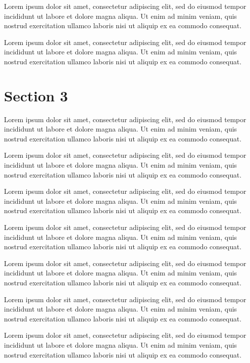 \documentclass{book}
\begin{document}
Lorem ipsum dolor sit amet, consectetur adipiscing elit, sed do eiusmod tempor incididunt ut labore et dolore magna aliqua. Ut enim ad minim veniam, quis nostrud exercitation ullamco laboris nisi ut aliquip ex ea commodo consequat.

Lorem ipsum dolor sit amet, consectetur adipiscing elit, sed do eiusmod tempor incididunt ut labore et dolore magna aliqua. Ut enim ad minim veniam, quis nostrud exercitation ullamco laboris nisi ut aliquip ex ea commodo consequat.

\section{Section 3}
Lorem ipsum dolor sit amet, consectetur adipiscing elit, sed do eiusmod tempor incididunt ut labore et dolore magna aliqua. Ut enim ad minim veniam, quis nostrud exercitation ullamco laboris nisi ut aliquip ex ea commodo consequat.

Lorem ipsum dolor sit amet, consectetur adipiscing elit, sed do eiusmod tempor incididunt ut labore et dolore magna aliqua. Ut enim ad minim veniam, quis nostrud exercitation ullamco laboris nisi ut aliquip ex ea commodo consequat.

Lorem ipsum dolor sit amet, consectetur adipiscing elit, sed do eiusmod tempor incididunt ut labore et dolore magna aliqua. Ut enim ad minim veniam, quis nostrud exercitation ullamco laboris nisi ut aliquip ex ea commodo consequat.

Lorem ipsum dolor sit amet, consectetur adipiscing elit, sed do eiusmod tempor incididunt ut labore et dolore magna aliqua. Ut enim ad minim veniam, quis nostrud exercitation ullamco laboris nisi ut aliquip ex ea commodo consequat.

Lorem ipsum dolor sit amet, consectetur adipiscing elit, sed do eiusmod tempor incididunt ut labore et dolore magna aliqua. Ut enim ad minim veniam, quis nostrud exercitation ullamco laboris nisi ut aliquip ex ea commodo consequat.

Lorem ipsum dolor sit amet, consectetur adipiscing elit, sed do eiusmod tempor incididunt ut labore et dolore magna aliqua. Ut enim ad minim veniam, quis nostrud exercitation ullamco laboris nisi ut aliquip ex ea commodo consequat.

Lorem ipsum dolor sit amet, consectetur adipiscing elit, sed do eiusmod tempor incididunt ut labore et dolore magna aliqua. Ut enim ad minim veniam, quis nostrud exercitation ullamco laboris nisi ut aliquip ex ea commodo consequat.
\end{document}
